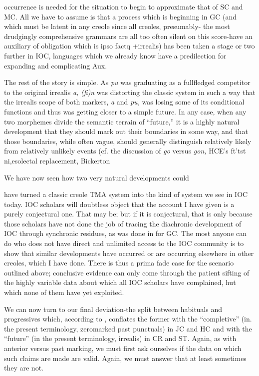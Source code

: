 occurrence is needed for the situation to begin to approximate that of SC and MC. All we have to assume is that a process which is begin\-ning in GC (and which must be latent in any creole since all creoles, presumably- the most drudgingly comprehensive grammars are all too often silent on this score-have an auxiliary of obligation which is ipso factq +irrealis) has been taken a stage or two further in IOC, languages which we already know have a predilection for expanding and complicating Aux.

The rest of the story is simple. As \textit{pu} was graduating as a full\-fledged competitor to the original irrealis \textit{a,} \textit{(fi)n} was distorting the classic system in such a way that the irrealis scope of both markers, \textit{a} and \textit{pu,} was losing some of its conditional functions and thus was getting closer to a simple future. In any case, when any two mor\-phemes divide the semantic terrain of ``future,'' it is a highly natural development that they should mark out their boundaries in some way, and that those boundaries, while often vague, should generally dis\-tinguish relatively likely from relatively unlikely events (cf. the discus\-sion of \textit{go} versus \textit{gon,} HCE's ft'tst ni,esolectal replacement, Bickerton

We have now seen how two very natural developments could

have turned a classic creole TMA system into the kind of system we see in IOC today. IOC scholars will doubtless object that the account I have given is a purely conjectural one. That may be; but if it is con\-jectural, that is only because those scholars have not done the job of tracing the diachronic development of IOC through synchronic resi\-dues, as was done in \citet{Bickerton1975} for GC. The most anyone can do who does not have direct and unlimited access to the IOC commun\-ity is to show that similar developments have occurred or are occurring elsewhere in other creoles, which I have done. There is thus a prima fade case for the scenario outlined above; conclusive evidence can only come through the patient sifting of the highly variable data about which all IOC scholars have complained, hut which none of them have yet exploited.

We can now turn to our final deviation-the split between habi\-tuals and progressives which, according to \citet{Taylor1971}, conflates the former with the ``completive'' (in. the present terminology, zero\-marked past punctuals) in JC and HC and with the ``future'' (in the present terminology, irrealis) in CR and ST. Again, as with anterior versus past marking, we must first ask ourselves if the data on which such claims are made are valid. Again, we must answer that at least sometimes they are not.

